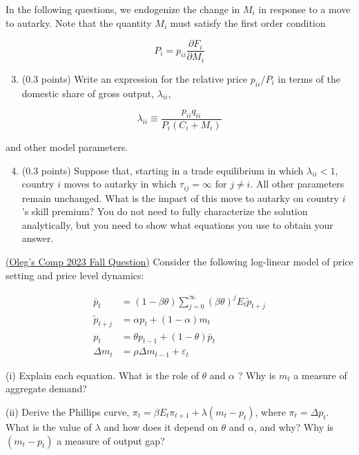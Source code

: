 \documentclass[answers]{exam}
\begin{document}
\begin{questions}
\begin{enumerate}
    \end{enumerate}
    
    In the following questions, we endogenize the change in $M_{i}$ in response to a move to autarky. Note that the quantity $M_{i}$ must satisfy the first order condition
    
    $$
    P_{i}=p_{i i} \frac{\partial F_{i}}{\partial M_{i}}
    $$
    
    \begin{enumerate}
      \setcounter{enumi}{2}
      \item (0.3 points) Write an expression for the relative price $p_{i i} / P_{i}$ in terms of the domestic share of gross output, $\lambda_{i i}$,
    \end{enumerate}
    
    $$
    \lambda_{i i} \equiv \frac{p_{i i} q_{i i}}{P_{i}\left(C_{i}+M_{i}\right)}
    $$
    
    and other model parameters.
    
    \begin{enumerate}
      \setcounter{enumi}{3}
      \item (0.3 points) Suppose that, starting in a trade equilibrium in which $\lambda_{i i}<1$, country $i$ moves to autarky in which $\tau_{i j}=\infty$ for $j \neq i$. All other parameters remain unchanged. What is the impact of this move to autarky on country $i$ 's skill premium? You do not need to fully characterize the solution analytically, but you need to show what equations you use to obtain your answer.
    \end{enumerate}
    \question  \href{https://economics.ucla.edu/wp-content/uploads/2023/11/MacroCompFall2023-1.pdf}{(Oleg's Comp 2023 Fall Question)}
    Consider the following log-linear model of price setting and price level dynamics:

$$
\begin{aligned}
\bar{p}_{t} & =(1-\beta \theta) \sum_{j=0}^{\infty}(\beta \theta)^{j} E_{t} \tilde{p}_{t+j} \\
\tilde{p}_{t+j} & =\alpha p_{t}+(1-\alpha) m_{t} \\
p_{t} & =\theta p_{t-1}+(1-\theta) \bar{p}_{t} \\
\Delta m_{t} & =\rho \Delta m_{t-1}+\varepsilon_{t}
\end{aligned}
$$

(i) Explain each equation. What is the role of $\theta$ and $\alpha$ ? Why is $m_{t}$ a measure of aggregate demand?

(ii) Derive the Phillips curve, $\pi_{t}=\beta E_{t} \pi_{t+1}+\lambda\left(m_{t}-p_{t}\right)$, where $\pi_{t}=\Delta p_{t}$. What is the value of $\lambda$ and how does it depend on $\theta$ and $\alpha$, and why? Why is $\left(m_{t}-p_{t}\right)$ a measure of output gap?


\end{questions}
\end{document}
